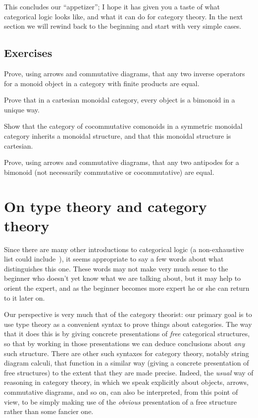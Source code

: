 \documentclass{book}
\begin{document}
This concludes our ``appetizer''; I hope it has given you a taste of what categorical logic looks like, and what it can do for category theory.
In the next section we will rewind back to the beginning and start with very simple cases.

\subsection*{Exercises}

\begin{ex}\label{ex:fp-inv-uniq}
  Prove, using arrows and commutative diagrams, that any two inverse operators for a monoid object in a category with finite products are equal.
\end{ex}

\begin{ex}\label{ex:cartmon-bimon-uniq}
  Prove that in a cartesian monoidal category, every object is a bimonoid in a unique way.
\end{ex}

\begin{ex}\label{ex:ccmon-cart}
  Show that the category of cocommutative comonoids in a symmetric monoidal category inherits a monoidal structure, and that this monoidal structure is cartesian.
\end{ex}

\begin{ex}\label{ex:antipode}
  Prove, using arrows and commutative diagrams, that any two antipodes for a bimonoid (not necessarily commutative or cocommutative) are equal.
\end{ex}


\section{On type theory and category theory}
\label{sec:generalities}

Since there are many other introductions to categorical logic (a non-exhaustive list could include~\cite{mr:focl,ls:hocl,jacobs:cltt,goldblatt:topoi,ptj:elephant}), it seems appropriate to say a few words about what distinguishes this one.
These words may not make very much sense to the beginner who doesn't yet know what we are talking about, but it may help to orient the expert, and as the beginner becomes more expert he or she can return to it later on.

Our perspective is very much that of the category theorist: our primary goal is to use type theory as a convenient syntax to prove things about categories.
The way that it does this is by giving concrete presentations of \emph{free} categorical structures, so that by working in those presentations we can deduce conclusions about \emph{any} such structure.
There are other such syntaxes for category theory, notably string diagram calculi, that function in a similar way (giving a concrete presentation of free structures) to the extent that they are made precise.
Indeed, the \emph{usual} way of reasoning in category theory, in which we speak explicitly about objects, arrows, commutative diagrams, and so on, can also be interpreted, from this point of view, to be simply making use of the \emph{obvious} presentation of a free structure rather than some fancier one.
\end{document}
